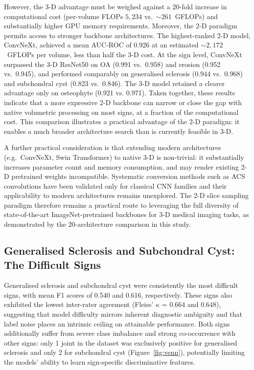 \documentclass[review,12pt]{elsarticle}
\begin{document}
However, the 3-D advantage must be weighed against a $20$-fold
increase in computational cost (per-volume FLOPs $5{,}234$ vs.\ ${\sim}261$~GFLOPs) and
substantially higher GPU memory requirements. Moreover, the 2-D
paradigm permits access to stronger backbone architectures. The
highest-ranked 2-D model, ConvNeXt, achieved a mean AUC-ROC of 0.926 at an
estimated ${\sim}2{,}172$~GFLOPs per volume, less than half the 3-D
cost. At the sign level, ConvNeXt surpassed the 3-D ResNet50 on OA
(0.991 vs.\ 0.958) and erosion (0.952 vs.\ 0.945), and performed
comparably on generalised sclerosis (0.944 vs.\ 0.968) and
subchondral cyst (0.823 vs.\ 0.846). The 3-D model retained a clearer
advantage only on osteophyte (0.921 vs. 0.971). Taken together, these
results indicate that a more expressive 2-D backbone can narrow or
close the gap with native volumetric processing on most signs, at a
fraction of the computational cost. This comparison illustrates a practical
advantage of the 2-D paradigm: it enables a much broader architecture
search than is currently feasible in 3-D. 

A further practical consideration is that extending modern architectures (e.g.\ ConvNeXt, Swin Transformer) to native 3-D is non-trivial: it substantially increases parameter count and memory consumption, and may render existing 2-D pretrained weights incompatible. Systematic conversion methods such as ACS convolutions \cite{yang2021reinventing} have been validated only for classical CNN families and their applicability to modern architectures remains unexplored. The 2-D slice sampling paradigm therefore remains a practical route to leveraging the full diversity of state-of-the-art ImageNet-pretrained backbones for 3-D medical imaging tasks, as demonstrated by the 20-architecture comparison in this study.

\subsection{Generalised Sclerosis and Subchondral Cyst: The Difficult Signs}

Generalised sclerosis and subchondral cyst were consistently the most difficult signs, with mean F1 scores of 0.540 and 0.616, respectively. These signs also exhibited the lowest inter-rater agreement (Fleiss' $\kappa$ = 0.664 and 0.648), suggesting that model difficulty mirrors inherent diagnostic ambiguity and that label noise places an intrinsic ceiling on attainable performance. Both signs additionally suffer from severe class imbalance and strong co-occurrence with other signs: only 1 joint in the dataset was exclusively positive for generalised sclerosis and only 2 for subchondral cyst (Figure~\ref{fig:venn}), potentially limiting the models' ability to learn sign-specific discriminative features.
\end{document}
